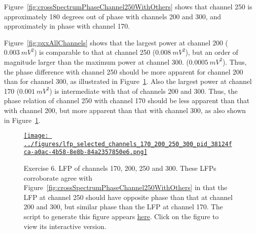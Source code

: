 \documentclass[12pt]{article}
\begin{document}
Figure~\ref{fig:crossSpectrumPhaseChannel250WithOthers} shows that channel 250
is approximately 180 degrees out of phase with channels 200 and 300, and
approximately in phase with channel 170.

Figure~\ref{fig:pxxAllChannels} shows that the largest power at channel 200
($0.003~mV^2$) is comparable to that at channel 250 ($0.008~mV^2$), but an
order of magnitude larger than the maximum power at channel 300.
($0.0005~mV^2$). Thus, the phase difference with channel 250 should be more
apparent for channel 200 than for channel 300, as illustrated in
Figure~\ref{fig:lfpSelectedChannels2}.
%
Also the largest power at channel 170 ($0.001~mV^2$) is intermediate with that
of channels 200 and 300. Thus, the phase relation of channel 250 with channel 170
should be less apparent than that with channel 200, but more apparent than that
with channel 300, as also shown in Figure~\ref{fig:lfpSelectedChannels2}.

\begin{figure}[H]
    \begin{center}
        \href{https://www.gatsby.ucl.ac.uk/~rapela/neuroinformatics/2023/ws3/figures/lfp_selected_channels_170_200_250_300_pid_38124fca-a0ac-4b58-8e8b-84a2357850e6.html}{\texttt{[image: ../figures/lfp\_selected\_channels\_170\_200\_250\_300\_pid\_38124fca-a0ac-4b58-8e8b-84a2357850e6.png]}}

        \caption{Exercise 6. LFP of channels 170, 200, 250 and 300. These LFPs
        corroborate agree with
        Figure~\ref{fig:crossSpectrumPhaseChannel250WithOthers} in that the LFP
        at channel
        250 should have opposite phase than that at channel 200 and 300, but
        similar phase than the LFP at channel 170.
        The script to generate this figure appears
        \href{https://github.com/joacorapela/neuroinformatics23/blob/master/worksheets/ws3/mySolution/code/scripts/doPlotSomeChannelsLFPs.py}{here}.
        Click on the figure to view its interactive version.}

        \label{fig:lfpSelectedChannels2}

        \end{center}
\end{figure}
\end{document}
